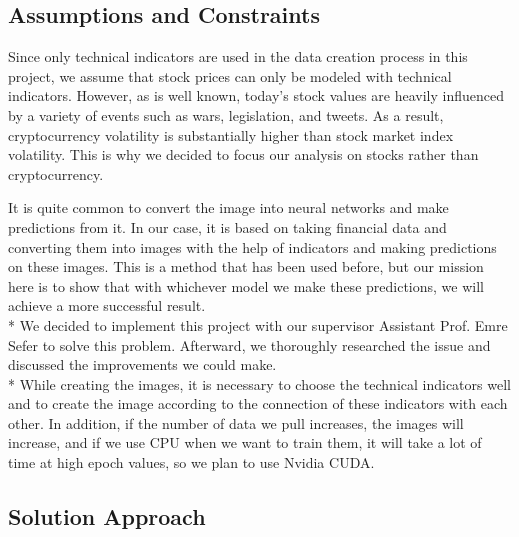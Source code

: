 \documentclass{article}
\begin{document}
\subsection{Assumptions and Constraints}
Since only technical indicators are used in the data creation process in this project, we assume that stock prices can only be modeled with technical indicators. However, as is well known, today's stock values are heavily influenced by a variety of events such as wars, legislation, and tweets. As a result, cryptocurrency volatility is substantially higher than stock market index volatility. This is why we decided to focus our analysis on stocks rather than cryptocurrency.

It is quite common to convert the image into neural networks and make predictions from it. In our case, it is based on taking financial data and converting them into images with the help of indicators and making predictions on these images. This is a method that has been used before, but our mission here is to show that with whichever model we make these predictions, we will achieve a more successful result. \vspace{0.2cm}\\*
We decided to implement this project with our supervisor Assistant Prof. Emre Sefer to solve this problem. Afterward, we thoroughly researched the issue and discussed the improvements we could make. \vspace{0.0005cm}\\*
While creating the images, it is necessary to choose the technical indicators well and to create the image according to the connection of these indicators with each other. In addition, if the number of data we pull increases, the images will increase, and if we use CPU when we want to train them, it will take a lot of time at high epoch values, so we plan to use Nvidia CUDA.

\begin{center}
    \item\section{Solution Approach}
\end{center}
\end{document}

